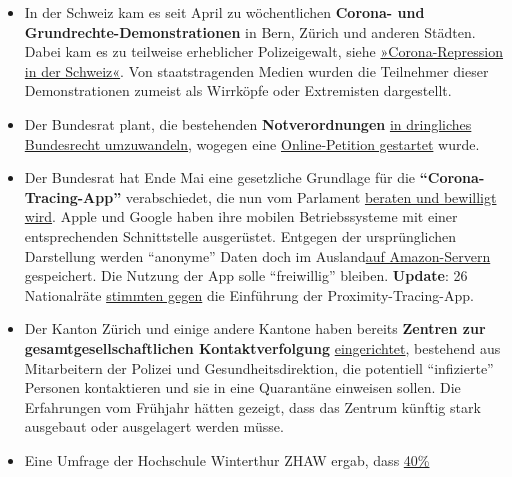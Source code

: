 \begin{itemize}
\tightlist
\item
  In der Schweiz kam es seit April zu wöchentlichen \textbf{Corona- und
  Grundrechte-Demonstrationen} in Bern, Zürich und anderen Städten.
  Dabei kam es zu teilweise erheblicher Polizeigewalt, siehe
  \href{https://swprs.org/corona-repression-in-der-schweiz/}{»Corona-Repression
  in der Schweiz«}. Von staatstragenden Medien wurden die Teilnehmer
  dieser Demonstrationen zumeist als Wirrköpfe oder Extremisten
  dargestellt.
\item
  Der Bundesrat plant, die bestehenden \textbf{Notverordnungen}
  \href{https://www.nau.ch/politik/bundeshaus/bundesrat-will-notverordnungen-zu-bundesrecht-machen-65700223}{in
  dringliches Bundesrecht umzuwandeln}, wogegen eine
  \href{https://www.zeitpunkt.ch/petition-gegen-umwandlung-der-notverordnungen-dringliches-bundesrecht-lanciert}{Online-Petition
  gestartet} wurde.
\item
  Der Bundesrat hat Ende Mai eine gesetzliche Grundlage für die
  \textbf{``Corona-Tracing-App''} verabschiedet, die nun vom Parlament
  \href{https://www.tagesanzeiger.ch/einsatz-der-schweizer-corona-warn-app-rueckt-naeher-690816478823}{beraten
  und bewilligt wird}. Apple und Google haben ihre mobilen
  Betriebssysteme mit einer entsprechenden Schnittstelle ausgerüstet.
  Entgegen der ursprünglichen Darstellung werden ``anonyme'' Daten doch
  im
  Ausland\href{https://www.nau.ch/politik/bundeshaus/deshalb-speichert-corona-app-daten-bei-amazon-deutschland-65717602}{auf
  Amazon-Servern} gespeichert. Die Nutzung der App solle ``freiwillig''
  bleiben. \textbf{Update}: 26 Nationalräte
  \href{https://www.parlament.ch/poly/Abstimmung/51/out/vote_51_20610.pdf}{stimmten
  gegen} die Einführung der Proximity-Tracing-App.
\item
  Der Kanton Zürich und einige andere Kantone haben bereits
  \textbf{Zentren zur gesamt­gesell­schaftlichen Kontaktverfolgung}
  \href{https://www.nzz.ch/zuerich/coronavirus-in-zuerich-contact-tracing-ist-gut-angelaufen-ld.1556846}{eingerichtet},
  bestehend aus Mitarbeitern der Polizei und Gesund­heits­direktion, die
  potentiell ``infizierte'' Personen kontaktieren und sie in eine
  Quarantäne einweisen sollen. Die Erfahrungen vom Frühjahr hätten
  gezeigt, dass das Zentrum künftig stark ausgebaut oder ausgelagert
  werden müsse.
\item
  Eine Umfrage der Hochschule Winterthur ZHAW ergab, dass
  \href{https://www.zhaw.ch/de/medien/medienmitteilungen/detailansicht-medienmitteilung/event-news/viele-schweizer-fuerchten-ueberwachung-durch-contact-tracing-app/}{40\%
}
\end{itemize}
